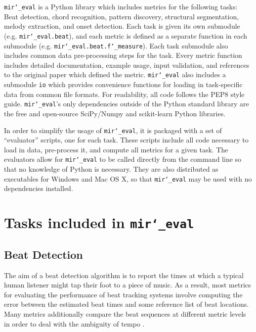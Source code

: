 \documentclass{article}
\def\mireval{\texttt{mir\char`_eval}}
\begin{document}
\mireval{} is a Python library which includes metrics for the following tasks: Beat detection, chord recognition, pattern discovery, structural segmentation, melody extraction, and onset detection.
Each task is given its own submodule (e.g. \mireval{}\texttt{.beat}), and each metric is defined as a separate function in each submodule (e.g. \mireval{}\texttt{.beat.f\char`_measure}).
Each task submodule also includes common data pre-processing steps for the task.
Every metric function includes detailed documentation, example usage, input validation, and references to the original paper which defined the metric.
\mireval{} also includes a submodule \texttt{io} which provides convenience functions for loading in task-specific data from common file formats.
For readability, all code follows the PEP8 style guide\cite{van2001pep}.
\mireval{}'s only dependencies outside of the Python standard library are the free and open-source SciPy/Numpy\cite{jones2001scipy} and scikit-learn\cite{pedregosa2011scikit} Python libraries.

In order to simplify the usage of \mireval{}, it is packaged with a set of ``evaluator'' scripts, one for each task.
These scripts include all code necessary to load in data, pre-process it, and compute all metrics for a given task.
The evaluators allow for \mireval{} to be called directly from the command line so that no knowledge of Python is necessary.
They are also distributed as executables for Windows and Mac OS X, so that \mireval{} may be used with no dependencies installed.

\section{Tasks included in \mireval{}}
\label{sec:tasks}

\subsection{Beat Detection}

The aim of a beat detection algorithm is to report the times at which a typical human listener might tap their foot to a piece of music.
As a result, most metrics for evaluating the performance of beat tracking systems involve computing the error between the estimated beat times and some reference list of beat locations.
Many metrics additionally compare the beat sequences at different metric levels in order to deal with the ambiguity of tempo \cite{levy2011improving}.
\end{document}
